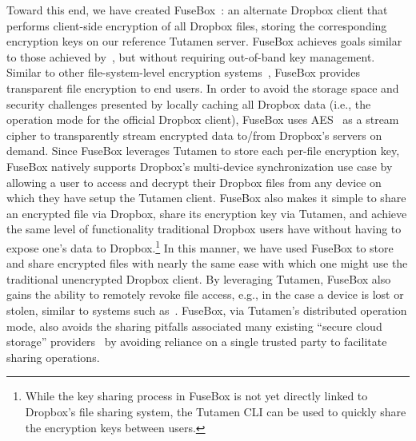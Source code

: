 Toward this end, we have created FuseBox~\cite{fusebox}: an alternate
Dropbox client that performs client-side encryption of all Dropbox
files, storing the corresponding encryption keys on our reference
Tutamen server. FuseBox achieves goals similar to those achieved
by~\cite{goh2003}, but without requiring out-of-band key
management. Similar to other file-system-level encryption
systems~\cite{blaze1993, Cattaneo2001, halcrow}, FuseBox provides
transparent file encryption to end users. In order to avoid the
storage space and security challenges presented by locally caching all
Dropbox data (i.e., the operation mode for the official Dropbox
client), FuseBox uses AES~\cite{daemen1999, nist2001} as a stream
cipher to transparently stream encrypted data to/from Dropbox's
servers on demand. Since FuseBox leverages Tutamen to store each
per-file encryption key, FuseBox natively supports Dropbox's
multi-device synchronization use case by allowing a user to access and
decrypt their Dropbox files from any device on which they have setup
the Tutamen client. FuseBox also makes it simple to share an encrypted
file via Dropbox, share its encryption key via Tutamen, and achieve
the same level of functionality traditional Dropbox users have without
having to expose one's data to Dropbox.\footnote{While the key sharing
  process in FuseBox is not yet directly linked to Dropbox's file
  sharing system, the Tutamen CLI can be used to quickly share the
  encryption keys between users.} In this manner, we have used FuseBox
to store and share encrypted files with nearly the same ease with
which one might use the traditional unencrypted Dropbox client. By
leveraging Tutamen, FuseBox also gains the ability to remotely revoke
file access, e.g., in the case a device is lost or stolen, similar to
systems such as~\cite{geambasu2011}. FuseBox, via Tutamen's
distributed operation mode, also avoids the sharing pitfalls
associated many existing ``secure cloud storage''
providers~\cite{wilson2014} by avoiding reliance on a single trusted
party to facilitate sharing operations.

